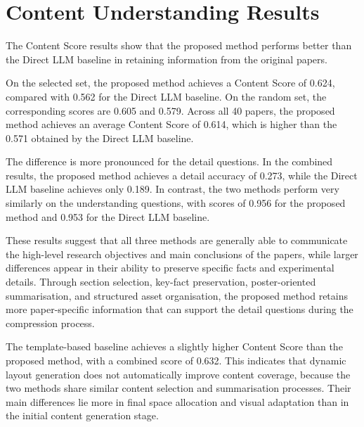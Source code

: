 \documentclass[12pt,oneside]{report}
\begin{document}
\section{Content Understanding Results}

The Content Score results show that the proposed method performs better than the Direct LLM baseline in retaining information from the original papers.

\vspace{1em}

On the selected set, the proposed method achieves a Content Score of 0.624, compared with 0.562 for the Direct LLM baseline. On the random set, the corresponding scores are 0.605 and 0.579. Across all 40 papers, the proposed method achieves an average Content Score of 0.614, which is higher than the 0.571 obtained by the Direct LLM baseline.

\vspace{1em}

The difference is more pronounced for the detail questions. In the combined results, the proposed method achieves a detail accuracy of 0.273, while the Direct LLM baseline achieves only 0.189. In contrast, the two methods perform very similarly on the understanding questions, with scores of 0.956 for the proposed method and 0.953 for the Direct LLM baseline.

\vspace{1em}

These results suggest that all three methods are generally able to communicate the high-level research objectives and main conclusions of the papers, while larger differences appear in their ability to preserve specific facts and experimental details. Through section selection, key-fact preservation, poster-oriented summarisation, and structured asset organisation, the proposed method retains more paper-specific information that can support the detail questions during the compression process.

\vspace{1em}

The template-based baseline achieves a slightly higher Content Score than the proposed method, with a combined score of 0.632. This indicates that dynamic layout generation does not automatically improve content coverage, because the two methods share similar content selection and summarisation processes. Their main differences lie more in final space allocation and visual adaptation than in the initial content generation stage.
\end{document}
